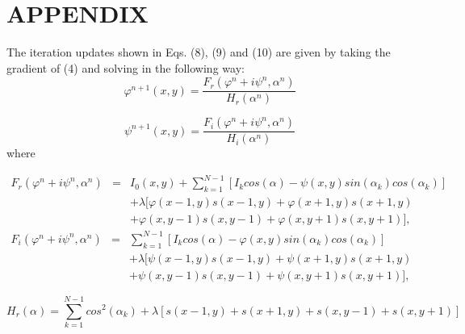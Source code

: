 \section*{APPENDIX}

The iteration updates shown in Eqs. (8), (9) and (10) are given by
taking the gradient of (4) and solving in the following way:
\begin{equation}
\varphi^{n+1}(x,y)=\frac{F_{r}(\varphi^{n}+i\psi^{n},\alpha^{n})}{H_{r}(\alpha^{
n})}
\end{equation}


\begin{equation}
\psi^{n+1}(x,y)=\frac{F_{i}(\varphi^{n}+i\psi^{n},\alpha^{n})}{H_{i}(\alpha^{n})
}
\end{equation}
where

\begin{eqnarray}
F_{r}(\varphi^{n}+i\psi^{n},\alpha^{n}) & = & I_{0}(x,y)+\sum_{k=1}^{N-1}[I_{k}
cos(\alpha)-\psi(x,y)sin(\alpha_{k})cos(\alpha_{k})]\nonumber \\
 &  & +\lambda[\varphi(x-1,y)s(x-1,y)+\varphi(x+1,y)s(x+1,y)\\
 &  & +\varphi(x,y-1)s(x,y-1)+\varphi(x,y+1)s(x,y+1)],\nonumber 
\end{eqnarray}
\begin{eqnarray}
F_{i}(\varphi^{n}+i\psi^{n},\alpha^{n}) & = & \sum_{k=1}^{N-1}[I_{k}cos(\alpha)-
\varphi(x,y)sin(\alpha_{k})cos(\alpha_{k})]\nonumber \\
 &  & +\lambda[\psi(x-1,y)s(x-1,y)+\psi(x+1,y)s(x+1,y)\\
 &  & +\psi(x,y-1)s(x,y-1)+\psi(x,y+1)s(x,y+1)],\nonumber 
\end{eqnarray}


\begin{equation}
H_{r}(\alpha)=\sum_{k=1}^{N-1}cos^{2}(\alpha_{k})+\lambda[s(x-1,y)+s(x+1,y)+s(x,
y-1)+s(x,y+1)]
\end{equation}


